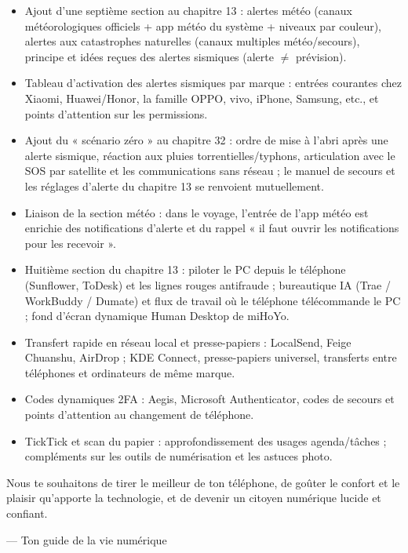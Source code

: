 
\begin{itemize}
  \item Ajout d'une septième section au chapitre 13 : alertes météo (canaux météorologiques officiels + app météo du système + niveaux par couleur), alertes aux catastrophes naturelles (canaux multiples météo/secours), principe et idées reçues des alertes sismiques (alerte $\neq$ prévision).
  \item Tableau d'activation des alertes sismiques par marque : entrées courantes chez Xiaomi, Huawei/Honor, la famille OPPO, vivo, iPhone, Samsung, etc., et points d'attention sur les permissions.
  \item Ajout du « scénario zéro » au chapitre 32 : ordre de mise à l'abri après une alerte sismique, réaction aux pluies torrentielles/typhons, articulation avec le SOS par satellite et les communications sans réseau ; le manuel de secours et les réglages d'alerte du chapitre 13 se renvoient mutuellement.
  \item Liaison de la section météo : dans le voyage, l'entrée de l'app météo est enrichie des notifications d'alerte et du rappel « il faut ouvrir les notifications pour les recevoir ».
\end{itemize}


\begin{itemize}
  \item Huitième section du chapitre 13 : piloter le PC depuis le téléphone (Sunflower, ToDesk) et les lignes rouges antifraude ; bureautique IA (Trae / WorkBuddy / Dumate) et flux de travail où le téléphone télécommande le PC ; fond d'écran dynamique Human Desktop de miHoYo.
  \item Transfert rapide en réseau local et presse-papiers : LocalSend, Feige Chuanshu, AirDrop ; KDE Connect, presse-papiers universel, transferts entre téléphones et ordinateurs de même marque.
  \item Codes dynamiques 2FA : Aegis, Microsoft Authenticator, codes de secours et points d'attention au changement de téléphone.
  \item TickTick et scan du papier : approfondissement des usages agenda/tâches ; compléments sur les outils de numérisation et les astuces photo.
\end{itemize}

Nous te souhaitons de tirer le meilleur de ton téléphone, de goûter le confort et le plaisir qu'apporte la technologie, et de devenir un citoyen numérique lucide et confiant.

— Ton guide de la vie numérique
